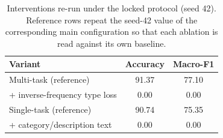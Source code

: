 \begin{table}[t]
\caption{Interventions re-run under the locked protocol (seed 42). Reference rows repeat the seed-42 value of the corresponding main configuration so that each ablation is read against its own baseline.}
\label{tab:ablation}
\centering
\small
\begin{tabular}{@{}lcc@{}}
\toprule
Variant & Accuracy & Macro-F1 \\
\midrule
Multi-task (reference) & 91.37 & 77.10 \\
\quad + inverse-frequency type loss & 0.00 & 0.00 \\
Single-task (reference) & 90.74 & 75.35 \\
\quad + category/description text & 0.00 & 0.00 \\

\bottomrule
\end{tabular}
\end{table}
